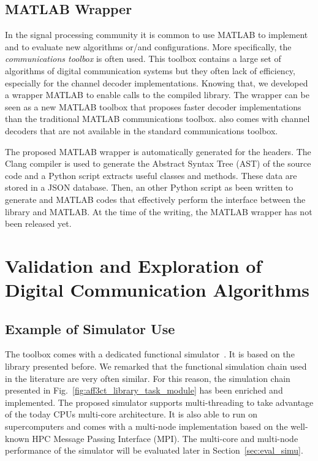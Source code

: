 \subsection{MATLAB Wrapper}

In the signal processing community it is common to use MATLAB to implement and
to evaluate new algorithms or/and configurations. More specifically, the
\emph{communications toolbox} is often used. This toolbox contains a large set
of algorithms of digital communication systems but they often lack of
efficiency, especially for the channel decoder implementations. Knowing that,
we developed a wrapper MATLAB to enable calls to the compiled \AFFECT library.
The wrapper can be seen as a new MATLAB toolbox that proposes faster decoder
implementations than the traditional MATLAB communications toolbox. \AFFECT
also comes with channel decoders that are not available in the standard
communications toolbox.

The proposed MATLAB wrapper is automatically generated for the \AFFECT headers.
The Clang compiler is used to generate the Abstract Syntax Tree (AST) of the
\AFFECT source code and a Python script extracts useful classes and methods.
These data are stored in a JSON database. Then, an other Python script as been
written to generate \Cxx and MATLAB codes that effectively perform the interface
between the \AFFECT library and MATLAB.
At the time of the writing, the MATLAB wrapper has not been released yet.

\section{Validation and Exploration of Digital Communication Algorithms}

\subsection{Example of Simulator Use}
\label{sec:aff3ct_simulator_example}

The \AFFECT toolbox comes with a dedicated functional
simulator~\cite{Cassagne2017}. It is based on the \AFFECT library presented
before. We remarked that the functional simulation chain used in the literature
are very often similar. For this reason, the simulation chain presented in
Fig.~\ref{fig:aff3ct_library_task_module} has been enriched and implemented. The
proposed simulator supports multi-threading to take advantage of the today CPUs
multi-core architecture. It is also able to run on supercomputers and comes with
a multi-node implementation based on the well-known HPC Message Passing
Interface (MPI). The multi-core and multi-node performance of the \AFFECT
simulator will be evaluated later in Section~\ref{sec:eval_simu}.

